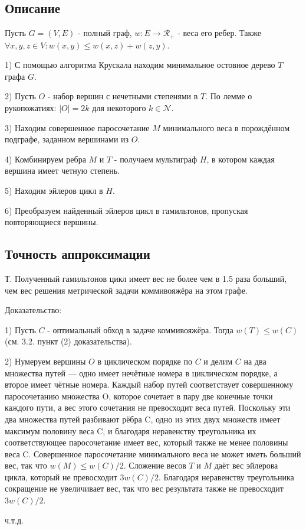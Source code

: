 \documentclass[a4paper,12pt]{article}
\begin{document}
\subsection{Описание}
Пусть $G = (V, E)$ - полный граф, $w: E \rightarrow \mathscr{R}_{+}$ - веса его ребер. Также $\forall x, y, z \in V: w(x, y) \leq w(x, z) + w(z, y)$. 

1) С помощью алгоритма Крускала находим минимальное остовное дерево $T$ графа $G$.

2) Пусть $O$ - набор вершин с нечетными степенями в $T$. По лемме о рукопожатиях: $|O| = 2k$ для некоторого $k \in \mathscr{N}$.

3) Находим совершенное паросочетание $M$ минимального веса в порождённом подграфе, заданном вершинами из $O$.

4) Комбинируем ребра $M$ и $T$ - получаем мультиграф $H$, в котором каждая вершина имеет четную степень.

5) Находим эйлеров цикл в $H$.

6) Преобразуем найденный эйлеров цикл в гамильтонов, пропуская повторяющиеся вершины.

\subsection{Точность аппроксимации}

Т. Полученный гамильтонов цикл имеет вес не более чем в 1.5 раза больший, чем вес решения метрической задачи коммивояжёра на этом графе.

Доказательство: 

1) Пусть $C$ - оптимальный обход в задаче коммивояжёра. Тогда $w(T) \leq w(C)$ (см. 3.2. пункт (2) доказательства).

2) Нумеруем вершины $O$ в циклическом порядке по $C$ и делим  $C$ на два множества путей — одно имеет нечётные номера в циклическом порядке, а второе имеет чётные номера. Каждый набор путей соответствует совершенному паросочетанию множества O, которое сочетает в пару две конечные точки каждого пути, а вес этого сочетания не превосходит веса путей. Поскольку эти два множества путей разбивают рёбра C, одно из этих двух множеств имеет максимум половину веса C, и благодаря неравенству треугольника их соответствующее паросочетание имеет вес, который также не менее половины веса C. Совершенное паросочетание минимального веса не может иметь больший вес, так что $w(M) \leq w(C)/2$. Сложение весов $T$ и $M$ даёт вес эйлерова цикла, который не превосходит $3w(C)/2$. Благодаря неравенству треугольника сокращение не увеличивает вес, так что вес результата также не превосходит $3w(C)/2$.

ч.т.д.
\end{document}
